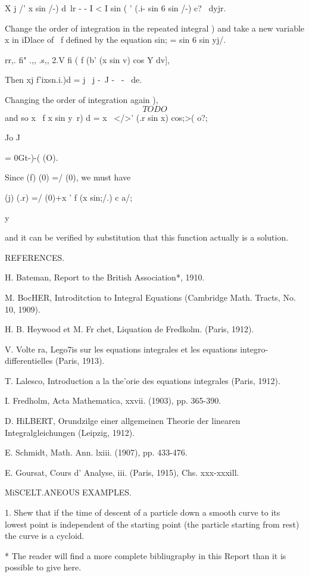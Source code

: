 {X j /' x sin \//-) d\ lr - - I < I sin ( ' (.i- sin 6 sin \//-) c? \
dyjr.

Change the order of integration in the repeated integral ) and
take a new variable x in iDlace of \ f defined by the equation sin; =
sin 6 sin yj/.

rr,. fi" .,, .s,, 2.V fi ( f (b' (x sin v) cos Y dv],

Then xj f'ixsn.i.)d = j \ j -~J -~ - \ de.

Changing the order of integration again ),
$$
TODO
$$
and so x \ f x sin y\ r) d = x \ </>' (.r sin x) cos;>( o?;

Jo J

= 0Gt-)-( (O).

Since (f) (0) =/ (0), we must have

(j) (.r) =/ (0)+x ' f (x sin;/.) c a/;

y

and it can be verified by substitution that this function actually is
a solution.

REFERENCES.

H. Bateman, Report to the British Association*, 1910.

M. BocHER, Introditction to Integral Equations (Cambridge Math.
Tracts, No. 10, 1909).

H. B. Heywood et M. Fr chet, Liquation de Fredkolm. (Paris, 1912).

V. Volte ra, Lego7is sur les equations integrales et les equations
integro-differentielles (Paris, 1913).

T. Lalesco, Introduction a la the'orie des equations integrales
(Paris, 1912).

I. Fredholm, Acta Mathematica, xxvii. (1903), pp. 365-390.

D. HiLBERT, Orundzilge einer allgemeinen Theorie der linearen
Integralgleichungen (Leipzig, 1912).

E. Schmidt, Math. Ann. lxiii. (1907), pp. 433-476.

E. Goursat, Cours d' Analyse, iii. (Paris, 1915), Chs. xxx-xxxill.

MiSCELT.ANEOUS EXAMPLES.

1. Shew that if the time of descent of a particle down a smooth curve
to its lowest point is independent of the starting point (the particle
starting from rest) the curve is a cycloid. \addexamplecitation{Abel.}

* The reader will find a more complete bibliugrapby in this Report
than it is possible to give here.

}
